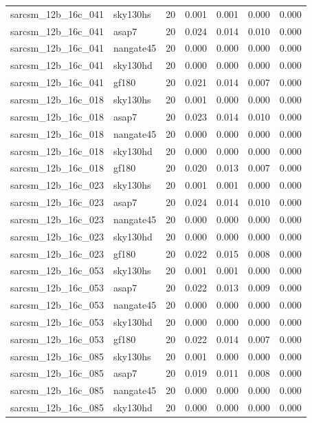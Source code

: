 \begin{tabular}{llrrrrr}
sarcsm\_12b\_16c\_041 & sky130hs & 20 & 0.001 & 0.001 & 0.000 & 0.000 \\
sarcsm\_12b\_16c\_041 & asap7 & 20 & 0.024 & 0.014 & 0.010 & 0.000 \\
sarcsm\_12b\_16c\_041 & nangate45 & 20 & 0.000 & 0.000 & 0.000 & 0.000 \\
sarcsm\_12b\_16c\_041 & sky130hd & 20 & 0.000 & 0.000 & 0.000 & 0.000 \\
sarcsm\_12b\_16c\_041 & gf180 & 20 & 0.021 & 0.014 & 0.007 & 0.000 \\
sarcsm\_12b\_16c\_018 & sky130hs & 20 & 0.001 & 0.000 & 0.000 & 0.000 \\
sarcsm\_12b\_16c\_018 & asap7 & 20 & 0.023 & 0.014 & 0.010 & 0.000 \\
sarcsm\_12b\_16c\_018 & nangate45 & 20 & 0.000 & 0.000 & 0.000 & 0.000 \\
sarcsm\_12b\_16c\_018 & sky130hd & 20 & 0.000 & 0.000 & 0.000 & 0.000 \\
sarcsm\_12b\_16c\_018 & gf180 & 20 & 0.020 & 0.013 & 0.007 & 0.000 \\
sarcsm\_12b\_16c\_023 & sky130hs & 20 & 0.001 & 0.001 & 0.000 & 0.000 \\
sarcsm\_12b\_16c\_023 & asap7 & 20 & 0.024 & 0.014 & 0.010 & 0.000 \\
sarcsm\_12b\_16c\_023 & nangate45 & 20 & 0.000 & 0.000 & 0.000 & 0.000 \\
sarcsm\_12b\_16c\_023 & sky130hd & 20 & 0.000 & 0.000 & 0.000 & 0.000 \\
sarcsm\_12b\_16c\_023 & gf180 & 20 & 0.022 & 0.015 & 0.008 & 0.000 \\
sarcsm\_12b\_16c\_053 & sky130hs & 20 & 0.001 & 0.001 & 0.000 & 0.000 \\
sarcsm\_12b\_16c\_053 & asap7 & 20 & 0.022 & 0.013 & 0.009 & 0.000 \\
sarcsm\_12b\_16c\_053 & nangate45 & 20 & 0.000 & 0.000 & 0.000 & 0.000 \\
sarcsm\_12b\_16c\_053 & sky130hd & 20 & 0.000 & 0.000 & 0.000 & 0.000 \\
sarcsm\_12b\_16c\_053 & gf180 & 20 & 0.022 & 0.014 & 0.007 & 0.000 \\
sarcsm\_12b\_16c\_085 & sky130hs & 20 & 0.001 & 0.000 & 0.000 & 0.000 \\
sarcsm\_12b\_16c\_085 & asap7 & 20 & 0.019 & 0.011 & 0.008 & 0.000 \\
sarcsm\_12b\_16c\_085 & nangate45 & 20 & 0.000 & 0.000 & 0.000 & 0.000 \\
sarcsm\_12b\_16c\_085 & sky130hd & 20 & 0.000 & 0.000 & 0.000 & 0.000 \\

\end{tabular}
